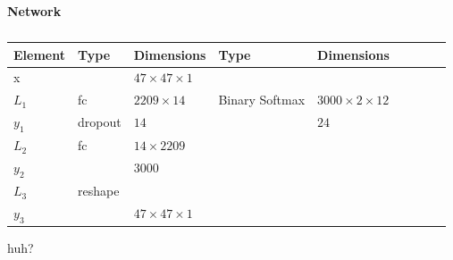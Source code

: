 \newpage
\begin{table}[h!]
  \caption*{\textbf{Network \networkI}}
	\centering
	{\footnotesize
		\begin{tabular}{|lllllllll|}
			\hline
			\multicolumn{1}{|l|}{Element} & Type    & \multicolumn{1}{l|}{Dimensions}           & Type           & \multicolumn{1}{l|}{Dimensions}            \\ \hline
			\multicolumn{1}{|l|}{x}       &         & \multicolumn{1}{l|}{$47\times47\times1$}  &                & \multicolumn{1}{l|}{}                      \\ \hline
			\multicolumn{1}{|l|}{$L_1$}   & fc      & \multicolumn{1}{l|}{$2209\times14$}       & Binary Softmax & \multicolumn{1}{l|}{$3000\times2\times12$} \\
			\multicolumn{1}{|l|}{$y_1$}   & dropout & \multicolumn{1}{l|}{$14$}                 &                & \multicolumn{1}{l|}{$24$}                  \\ \hline
			\multicolumn{1}{|l|}{$L_2$}   & fc      & \multicolumn{1}{l|}{$14\times2209$}       &                & \multicolumn{1}{l|}{}                      \\
			\multicolumn{1}{|l|}{$y_2$}   &         & \multicolumn{1}{l|}{$3000$}               &                & \multicolumn{1}{l|}{}                      \\ \hline
			\multicolumn{1}{|l|}{$L_3$}   & reshape & \multicolumn{1}{l|}{}                     &                & \multicolumn{1}{l|}{}                      \\
			\multicolumn{1}{|l|}{$y_3$}   &         & \multicolumn{1}{l|}{$47\times47\times 1$} &                & \multicolumn{1}{l|}{}                      \\ \hline
		\end{tabular}

		\caption{} \label{net:simple1}

	}
\end{table}
huh?
